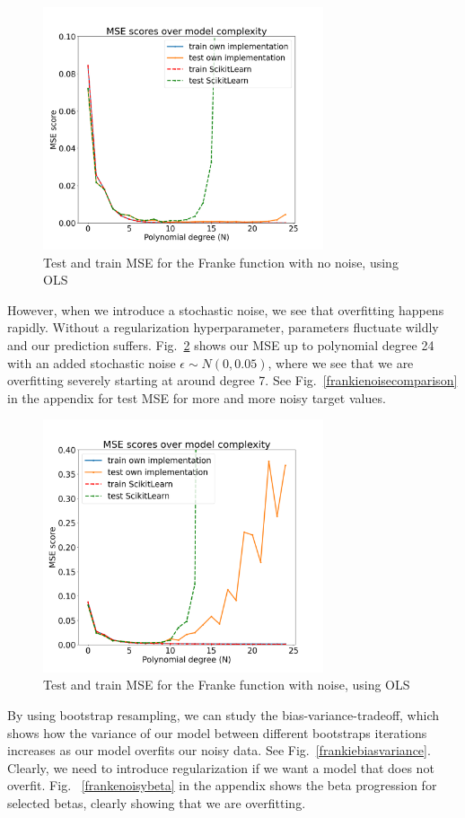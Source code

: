 \documentclass[twocolumn,10pt,cleanfoot]{asme2ej}
\begin{document}
\begin{figure}[h]
\centerline{\includegraphics[width=3.25in]{figure/frankenonoisemse.png}}
\caption{Test and train MSE for the Franke function with no noise, using OLS}
\label{frankenonoisemse}
\end{figure}

However, when we introduce a stochastic noise, we see that overfitting happens rapidly. Without a regularization hyperparameter, parameters fluctuate wildly and our prediction suffers. Fig.~\ref{frankenoisemse} shows our MSE up to polynomial degree 24 with an added stochastic noise $\epsilon \sim N(0,0.05)$, where we see that we are overfitting severely starting at around degree 7. See Fig.~\ref{frankienoisecomparison} in the appendix for test MSE for more and more noisy target values. 

\begin{figure}[h]
\centerline{\includegraphics[width=3.25in]{figure/frankenoisemse.png}}
\caption{Test and train MSE for the Franke function with noise, using OLS}
\label{frankenoisemse}
\end{figure}

By using bootstrap resampling, we can study the bias-variance-tradeoff, which shows how the variance of our model between different bootstraps iterations increases as our model overfits our noisy data. See Fig.~\ref{frankiebiasvariance}. Clearly, we need to introduce regularization if we want a model that does not overfit. Fig. ~\ref{frankenoisybeta} in the appendix shows the beta progression for selected betas, clearly showing that we are overfitting.
\end{document}
